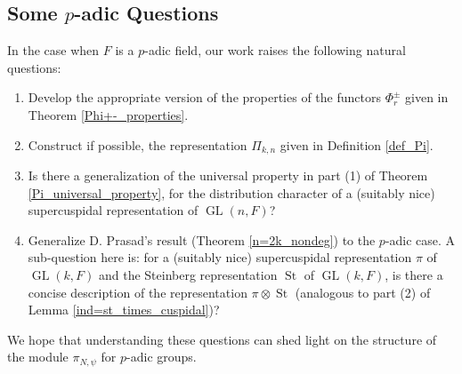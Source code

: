 \documentclass[reqno]{amsart}
\newtheorem{corollary}[theorem]{Corollary}
\theoremstyle{definition}
\theoremstyle{remark}
\numberwithin{equation}{section}
\DeclareMathOperator{\Ind}{Ind}
\DeclareMathOperator{\GL}{GL}
\DeclareMathOperator{\St}{St}
\begin{document}


\subsection{Some $p$-adic Questions} In the case when $F$ is a $p$-adic field, our work raises the following natural questions:\begin{enumerate}
    \item  Develop the appropriate version of the properties of the functors $\Phi_r^{\pm}$ given in  Theorem \ref{Phi+-_properties}. 
    \item Construct if possible,  the representation $\Pi_{k,n}$ given in Definition \ref{def_Pi}.
    \item Is there a generalization of  the universal property in part (1) of Theorem \ref{Pi_universal_property}, for the distribution character of a (suitably nice) supercuspidal representation of $\GL(n,F)$?
    \item Generalize D. Prasad's result (Theorem \ref{n=2k_nondeg}) to the $p$-adic case. A sub-question here is: for a (suitably nice) supercuspidal representation $\pi$ of $\GL(k,F)$ and the Steinberg representation $\St$ of $\GL(k,F)$, is there a concise description of the representation $\pi \otimes \St$ (analogous to part (2) of   Lemma \ref{ind=st_times_cuspidal})?
    \end{enumerate} 
We hope that understanding these questions can shed light on the  structure of the module $\pi_{N, \psi}$ for $p$-adic groups. 
\end{document}
